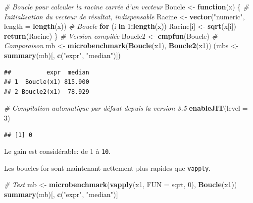 \documentclass[
  12pt,
  french,
  a4paper,
  extrafontsizes,onecolumn,openright
  ]{memoir}
\newenvironment{Shaded}{\begin{snugshade}}{\end{snugshade}}
\newcommand{\CommentTok}[1]{\textcolor[rgb]{0.56,0.35,0.01}{\textit{#1}}}
\newcommand{\ControlFlowTok}[1]{\textcolor[rgb]{0.13,0.29,0.53}{\textbf{#1}}}
\newcommand{\DataTypeTok}[1]{\textcolor[rgb]{0.13,0.29,0.53}{#1}}
\newcommand{\DecValTok}[1]{\textcolor[rgb]{0.00,0.00,0.81}{#1}}
\newcommand{\KeywordTok}[1]{\textcolor[rgb]{0.13,0.29,0.53}{\textbf{#1}}}
\newcommand{\NormalTok}[1]{#1}
\newcommand{\OperatorTok}[1]{\textcolor[rgb]{0.81,0.36,0.00}{\textbf{#1}}}
\newcommand{\StringTok}[1]{\textcolor[rgb]{0.31,0.60,0.02}{#1}}
\begin{document}
\begin{Shaded}
\begin{Highlighting}[]
\CommentTok{# Boucle pour calculer la racine carrée d'un vecteur}
\NormalTok{Boucle <-}\StringTok{ }\ControlFlowTok{function}\NormalTok{(x) \{}
    \CommentTok{# Initialisation du vecteur de résultat, indispensable}
\NormalTok{    Racine <-}\StringTok{ }\KeywordTok{vector}\NormalTok{(}\StringTok{"numeric"}\NormalTok{, }\DataTypeTok{length =} \KeywordTok{length}\NormalTok{(x))}
    \CommentTok{# Boucle}
    \ControlFlowTok{for}\NormalTok{ (i }\ControlFlowTok{in} \DecValTok{1}\OperatorTok{:}\KeywordTok{length}\NormalTok{(x)) Racine[i] <-}\StringTok{ }\KeywordTok{sqrt}\NormalTok{(x[i])}
    \KeywordTok{return}\NormalTok{(Racine)}
\NormalTok{\}}
\CommentTok{# Version compilée}
\NormalTok{Boucle2 <-}\StringTok{ }\KeywordTok{cmpfun}\NormalTok{(Boucle)}
\CommentTok{# Comparaison}
\NormalTok{mb <-}\StringTok{ }\KeywordTok{microbenchmark}\NormalTok{(}\KeywordTok{Boucle}\NormalTok{(x1), }\KeywordTok{Boucle2}\NormalTok{(x1))}
\NormalTok{(mbs <-}\StringTok{ }\KeywordTok{summary}\NormalTok{(mb)[, }\KeywordTok{c}\NormalTok{(}\StringTok{"expr"}\NormalTok{, }\StringTok{"median"}\NormalTok{)])}
\end{Highlighting}
\end{Shaded}

\begin{verbatim}
##          expr  median
## 1  Boucle(x1) 815.900
## 2 Boucle2(x1)  78.929
\end{verbatim}

\begin{Shaded}
\begin{Highlighting}[]
\CommentTok{# Compilation automatique par défaut depuis la version 3.5}
\KeywordTok{enableJIT}\NormalTok{(}\DataTypeTok{level =} \DecValTok{3}\NormalTok{)}
\end{Highlighting}
\end{Shaded}

\begin{verbatim}
## [1] 0
\end{verbatim}

\normalsize
Le gain est considérable: de 1 à \texttt{10}.

Les boucles for sont maintenant nettement plus rapides que \texttt{vapply}.

\scriptsize

\begin{Shaded}
\begin{Highlighting}[]
\CommentTok{# Test}
\NormalTok{mb <-}\StringTok{ }\KeywordTok{microbenchmark}\NormalTok{(}\KeywordTok{vapply}\NormalTok{(x1, }\DataTypeTok{FUN =}\NormalTok{ sqrt, }\DecValTok{0}\NormalTok{), }\KeywordTok{Boucle}\NormalTok{(x1))}
\KeywordTok{summary}\NormalTok{(mb)[, }\KeywordTok{c}\NormalTok{(}\StringTok{"expr"}\NormalTok{, }\StringTok{"median"}\NormalTok{)]}
\end{Highlighting}
\end{Shaded}
\end{document}

